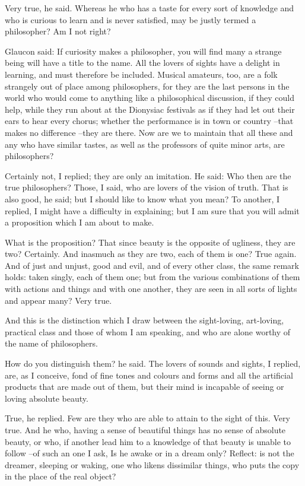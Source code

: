 Very true, he said.
Whereas he who has a taste for every sort of knowledge and who is curious to learn and is never satisfied, may be justly termed a philosopher? Am I not right?

Glaucon said: If curiosity makes a philosopher, you will find many a strange being will have a title to the name. All the lovers of sights have a delight in learning, and must therefore be included. Musical amateurs, too, are a folk strangely out of place among philosophers, for they are the last persons in the world who would come to anything like a philosophical discussion, if they could help, while they run about at the Dionysiac festivals as if they had let out their ears to hear every chorus; whether the performance is in town or country --that makes no difference --they are there. Now are we to maintain that all these and any who have similar tastes, as well as the professors of quite minor arts, are philosophers?

Certainly not, I replied; they are only an imitation.
He said: Who then are the true philosophers?
Those, I said, who are lovers of the vision of truth.
That is also good, he said; but I should like to know what you mean?
To another, I replied, I might have a difficulty in explaining; but I am sure that you will admit a proposition which I am about to make.

What is the proposition?
That since beauty is the opposite of ugliness, they are two?
Certainly.
And inasmuch as they are two, each of them is one?
True again.
And of just and unjust, good and evil, and of every other class, the same remark holds: taken singly, each of them one; but from the various combinations of them with actions and things and with one another, they are seen in all sorts of lights and appear many? Very true.

And this is the distinction which I draw between the sight-loving, art-loving, practical class and those of whom I am speaking, and who are alone worthy of the name of philosophers.

How do you distinguish them? he said.
The lovers of sounds and sights, I replied, are, as I conceive, fond of fine tones and colours and forms and all the artificial products that are made out of them, but their mind is incapable of seeing or loving absolute beauty.

True, he replied.
Few are they who are able to attain to the sight of this.
Very true.
And he who, having a sense of beautiful things has no sense of absolute beauty, or who, if another lead him to a knowledge of that beauty is unable to follow --of such an one I ask, Is he awake or in a dream only? Reflect: is not the dreamer, sleeping or waking, one who likens dissimilar things, who puts the copy in the place of the real object?

